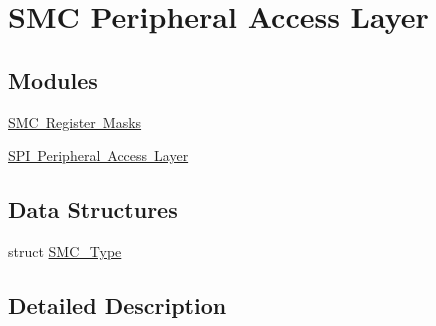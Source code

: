 \hypertarget{group___s_m_c___peripheral___access___layer}{}\section{S\+MC Peripheral Access Layer}
\label{group___s_m_c___peripheral___access___layer}
\subsection*{Modules}
\begin{DoxyCompactItemize}
\item 
\mbox{\hyperlink{group___s_m_c___register___masks}{S\+M\+C Register Masks}}
\item 
\mbox{\hyperlink{group___s_p_i___peripheral___access___layer}{S\+P\+I Peripheral Access Layer}}
\end{DoxyCompactItemize}
\subsection*{Data Structures}
\begin{DoxyCompactItemize}
\item 
struct \mbox{\hyperlink{struct_s_m_c___type}{S\+M\+C\+\_\+\+Type}}
\end{DoxyCompactItemize}


\subsection{Detailed Description}

